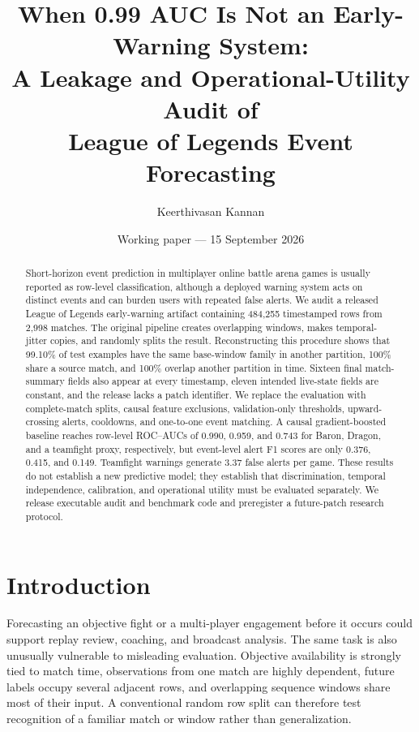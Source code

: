 \documentclass[10pt]{article}
\title{When 0.99 AUC Is Not an Early-Warning System:\\
A Leakage and Operational-Utility Audit of\\
League of Legends Event Forecasting}
\author{Keerthivasan Kannan}
\date{Working paper --- 15 September 2026}
\begin{document}
\maketitle

\begin{abstract}
Short-horizon event prediction in multiplayer online battle arena games is
usually reported as row-level classification, although a deployed warning
system acts on distinct events and can burden users with repeated false alerts.
We audit a released League of Legends early-warning artifact containing
484,255 timestamped rows from 2,998 matches. The original pipeline creates
overlapping windows, makes temporal-jitter copies, and randomly splits the
result. Reconstructing this procedure shows that 99.10\% of test examples have
the same base-window family in another partition, 100\% share a source match,
and 100\% overlap another partition in time. Sixteen final match-summary fields
also appear at every timestamp, eleven intended live-state fields are constant,
and the release lacks a patch identifier. We replace the evaluation with
complete-match splits, causal feature exclusions, validation-only thresholds,
upward-crossing alerts, cooldowns, and one-to-one event matching. A causal
gradient-boosted baseline reaches row-level ROC--AUCs of 0.990, 0.959, and 0.743
for Baron, Dragon, and a teamfight proxy, respectively, but event-level alert
F1 scores are only 0.376, 0.415, and 0.149. Teamfight warnings generate 3.37
false alerts per game. These results do not establish a new predictive model;
they establish that discrimination, temporal independence, calibration, and
operational utility must be evaluated separately. We release executable audit
and benchmark code and preregister a future-patch research protocol.
\end{abstract}

\section{Introduction}

Forecasting an objective fight or a multi-player engagement before it occurs
could support replay review, coaching, and broadcast analysis. The same task is
also unusually vulnerable to misleading evaluation. Objective availability is
strongly tied to match time, observations from one match are highly dependent,
future labels occupy several adjacent rows, and overlapping sequence windows
share most of their input. A conventional random row split can therefore test
recognition of a familiar match or window rather than generalization.
\end{document}
